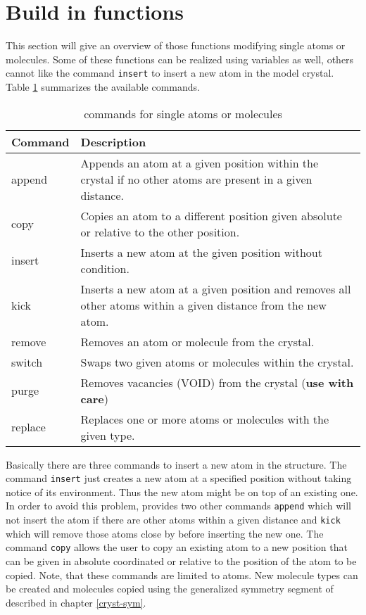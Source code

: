 
\section{Build in functions \label{mod-buildin}}

This section will give an overview of those \Discus functions
modifying single atoms or molecules.  Some of these functions can be
realized using variables as well, others cannot like the command
{\tt insert} to insert a new atom in the model crystal.  Table
\ref{mod-tab-1} summarizes the available commands.
%
\begin{table}[!tbh]
\centering
\begin{tabularx}{\textwidth}{|p{30mm}|X|}
  \hline
  {\bf Command} & {\bf Description} \\
  \hline\hline
  append  & Appends an atom at a given position within the crystal if
            no other atoms are present in a given distance.\\
  copy    & Copies an atom to a different position given absolute or
            relative to the other position.\\
  insert  & Inserts a new atom at the given position without condition.\\
  kick    & Inserts a new atom at a given position and removes all
            other atoms within a given distance from the new atom.\\
  remove  & Removes an atom or molecule from the crystal.\\
  switch  & Swaps two given atoms or molecules within the crystal.\\
  purge   & Removes vacancies (VOID) from the crystal ({\bf use with
            care})\\
  replace & Replaces one or more atoms or molecules with the given
            type.\\
  \hline
\end{tabularx}
\caption{\label{mod-tab-1}\Discus commands for single atoms or
         molecules}
\end{table}
%
Basically there are three commands to insert a new atom in the
structure. The command {\tt insert} just creates a new atom at a
specified position without taking notice of its environment. Thus
the new atom might be on top of an existing one. In order to avoid
this problem, \Discus provides two other commands {\tt append}
which will not insert the atom if there are other atoms within a
given distance and {\tt kick} which will remove those atoms close by
before inserting the new one. The command {\tt copy} allows the user
to copy an existing atom to a new position that can be given in
absolute coordinated or relative to the position of the atom to be
copied. Note, that these commands are limited to atoms. New molecule
types can be created and molecules copied using the generalized
symmetry segment of \Discus described in chapter
\ref{cryst-sym}. \par

